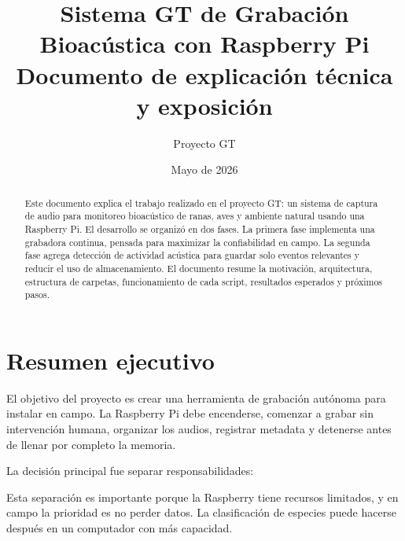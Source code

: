\documentclass[11pt,letterpaper]{article}
\title{\textbf{Sistema GT de Grabación Bioacústica con Raspberry Pi}\\
\large Documento de explicación técnica y exposición}
\author{Proyecto GT}
\date{Mayo de 2026}
\begin{document}
\maketitle
\thispagestyle{empty}

\begin{abstract}
Este documento explica el trabajo realizado en el proyecto GT: un sistema de captura de audio para monitoreo bioacústico de ranas, aves y ambiente natural usando una Raspberry Pi. El desarrollo se organizó en dos fases. La primera fase implementa una grabadora continua, pensada para maximizar la confiabilidad en campo. La segunda fase agrega detección de actividad acústica para guardar solo eventos relevantes y reducir el uso de almacenamiento. El documento resume la motivación, arquitectura, estructura de carpetas, funcionamiento de cada script, resultados esperados y próximos pasos.
\end{abstract}

\tableofcontents
\newpage

\section{Resumen ejecutivo}

El objetivo del proyecto es crear una herramienta de grabación autónoma para instalar en campo. La Raspberry Pi debe encenderse, comenzar a grabar sin intervención humana, organizar los audios, registrar metadata y detenerse antes de llenar por completo la memoria.

La decisión principal fue separar responsabilidades:

\begin{center}
\end{center}

Esta separación es importante porque la Raspberry tiene recursos limitados, y en campo la prioridad es no perder datos. La clasificación de especies puede hacerse después en un computador con más capacidad.
\end{document}
